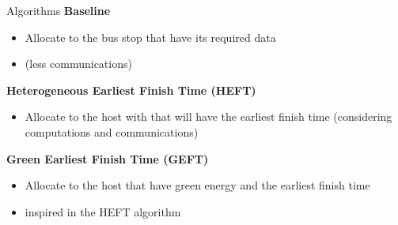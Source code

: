 \documentclass[Ligatures=TeX,table,svgnames,usetotalslideindicator,compress,10pt,aspectratio=169]{beamer}
\begin{document}
\begin{frame}{Algorithms}
 \textbf{Baseline}
  \begin{itemize}
      \item Allocate to the bus stop that have its required data
      \item (less communications)
  \end{itemize}

\textbf{   Heterogeneous Earliest Finish Time (HEFT)}\footnotemark[3]  \begin{itemize}
      \item Allocate to the host with that will have the earliest finish time (considering computations and communications)    
  \end{itemize}


\textbf{   Green Earliest Finish Time (GEFT)}  \begin{itemize}
      \item Allocate to the host that have green energy and the earliest finish time 
      \item inspired in the HEFT algorithm
  \end{itemize}

  \end{frame}
\end{document}
